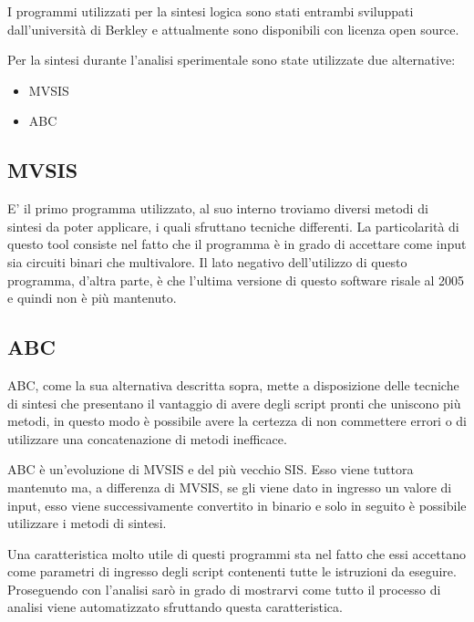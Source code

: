 \documentclass[
  italian,
]{book}
\providecommand{\tightlist}{%
  \setlength{\itemsep}{0pt}\setlength{\parskip}{0pt}}
\begin{document}
I programmi utilizzati per la sintesi logica sono stati entrambi sviluppati dall'università di Berkley e attualmente sono disponibili con licenza open source.

Per la sintesi durante l'analisi sperimentale sono state utilizzate due alternative:

\begin{itemize}
\tightlist
\item
  MVSIS
\item
  ABC
\end{itemize}

\hypertarget{mvsis-1}{%
\subsection{MVSIS}\label{mvsis-1}}

E' il primo programma utilizzato, al suo interno troviamo diversi metodi di sintesi da poter applicare, i quali sfruttano tecniche differenti. La particolarità di questo tool consiste nel fatto che il programma è in grado di accettare come input sia circuiti binari che multivalore. Il lato negativo dell'utilizzo di questo programma, d'altra parte, è che l'ultima versione di questo software risale al 2005 e quindi non è più mantenuto.

\hypertarget{abc-1}{%
\subsection{ABC}\label{abc-1}}

ABC, come la sua alternativa descritta sopra, mette a disposizione delle tecniche di sintesi che presentano il vantaggio di avere degli script pronti che uniscono più metodi, in questo modo è possibile avere la certezza di non commettere errori o di utilizzare una concatenazione di metodi inefficace.

ABC è un'evoluzione di MVSIS e del più vecchio SIS. Esso viene tuttora mantenuto ma, a differenza di MVSIS, se gli viene dato in ingresso un valore di input, esso viene successivamente convertito in binario e solo in seguito è possibile utilizzare i metodi di sintesi.

Una caratteristica molto utile di questi programmi sta nel fatto che essi accettano come parametri di ingresso degli script contenenti tutte le istruzioni da eseguire. Proseguendo con l'analisi sarò in grado di mostrarvi come tutto il processo di analisi viene automatizzato sfruttando questa caratteristica.

\newpage
\end{document}

